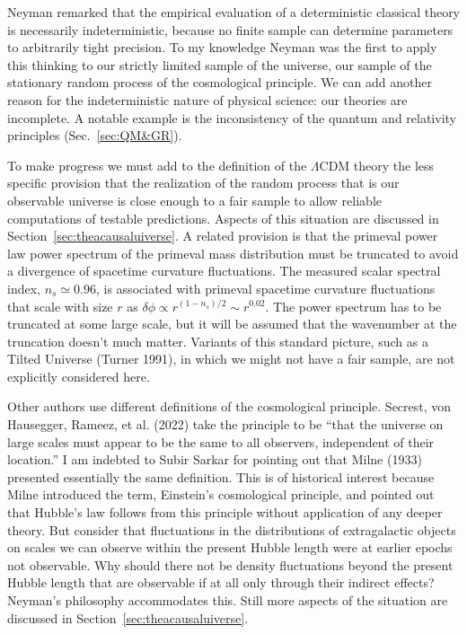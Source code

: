 \documentclass[fleqn,usenatbib]{mnras}
\begin{document}
Neyman remarked that the empirical evaluation of a deterministic classical theory is necessarily indeterministic, because no finite sample can determine parameters to arbitrarily tight precision. To my knowledge Neyman was the first to apply this thinking to our strictly limited sample of the universe, our sample of the stationary random process of the cosmological principle. We can add another reason for the  indeterministic nature of physical science: our theories are incomplete. A notable example is the inconsistency of the quantum and relativity principles (Sec.~\ref{sec:QM&GR}).

To make progress we must add to the definition of the $\Lambda$CDM theory the less specific provision that the realization of the random process that is our observable universe is close enough to a fair sample to allow reliable computations of testable predictions. Aspects of this situation are discussed in Section~\ref{sec:theacausaluiverse}. A related provision is that the primeval power law power spectrum of the primeval mass distribution must be truncated to avoid a divergence of spacetime curvature fluctuations. The measured scalar spectral index, $n_s\simeq 0.96$, is associated with primeval spacetime curvature fluctuations that scale with size $r$ as $\delta\phi\propto r^{(1-n_s)/2}\sim r^{0.02}$. The power spectrum has to be truncated at some large scale, but it will be assumed that the wavenumber at the truncation doesn't much matter.  Variants of this standard picture, such as a Tilted Universe (Turner 1991), in which we might not have a fair sample, are not explicitly considered here. 

Other authors use different definitions of the cosmological principle.  Secrest, von Hausegger, Rameez, et al. (2022) take the principle to be ``that the universe on large scales must appear to be the same to all observers, independent of their location.'' I am indebted to Subir Sarkar for pointing out that Milne (1933) presented essentially the same definition. This is of historical interest because Milne introduced the term, Einstein's cosmological principle, and pointed out that Hubble's law follows from this principle without application of any deeper theory. But consider that fluctuations in the distributions of extragalactic objects on scales we can observe within the present Hubble length were at earlier epochs not observable. Why should there not be density fluctuations beyond the present Hubble length that are observable if at all only through their indirect effects? Neyman's philosophy accommodates this. Still more aspects of the situation are discussed in Section~\ref{sec:theacausaluiverse}.
\end{document}
